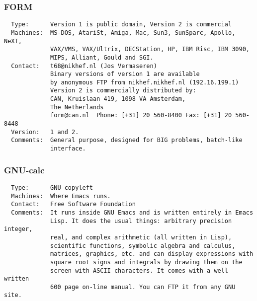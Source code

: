 \subsubsection{FORM}
\begin{verbatim}
  Type:      Version 1 is public domain, Version 2 is commercial
  Machines:  MS-DOS, AtariSt, Amiga, Mac, Sun3, SunSparc, Apollo, NeXT,
             VAX/VMS, VAX/Ultrix, DECStation, HP, IBM Risc, IBM 3090,
             MIPS, Alliant, Gould and SGI.
  Contact:   t68@nikhef.nl (Jos Vermaseren)
             Binary versions of version 1 are available
             by anonymous FTP from nikhef.nikhef.nl (192.16.199.1)
             Version 2 is commercially distributed by:
             CAN, Kruislaan 419, 1098 VA Amsterdam,
             The Netherlands
             form@can.nl  Phone: [+31] 20 560-8400 Fax: [+31] 20 560-8448
  Version:   1 and 2.
  Comments:  General purpose, designed for BIG problems, batch-like
             interface.
\end{verbatim}

\subsubsection{GNU-calc}
\begin{verbatim}
  Type:      GNU copyleft
  Machines:  Where Emacs runs.
  Contact:   Free Software Foundation
  Comments:  It runs inside GNU Emacs and is written entirely in Emacs
             Lisp. It does the usual things: arbitrary precision integer,
             real, and complex arithmetic (all written in Lisp),
             scientific functions, symbolic algebra and calculus,
             matrices, graphics, etc. and can display expressions with
             square root signs and integrals by drawing them on the
             screen with ASCII characters. It comes with a well written
             600 page on-line manual. You can FTP it from any GNU site.
\end{verbatim}

